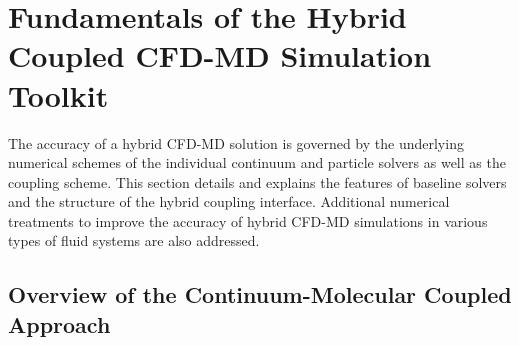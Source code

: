 \documentclass[preprint,12pt]{elsarticle}
\begin{document}
\section{Fundamentals of the Hybrid Coupled CFD-MD Simulation Toolkit}
\label{sec:numerical}


The accuracy of a hybrid CFD-MD solution is governed by the underlying numerical schemes of the individual continuum and particle solvers as well as the coupling scheme. This section details and explains the features of baseline solvers and the structure of the hybrid coupling interface. Additional numerical treatments to improve the accuracy of hybrid CFD-MD simulations in various types of fluid systems are also addressed.

\subsection{Overview of the Continuum-Molecular Coupled Approach}

\end{document}

